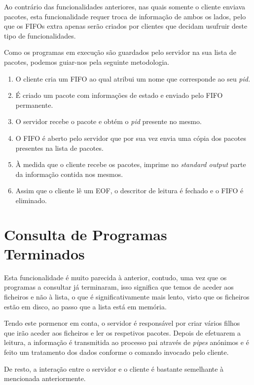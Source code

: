 \documentclass[12pt,a4paper]{report}
\begin{document}
        Ao contrário das funcionalidades anteriores, nas quais somente o cliente enviava pacotes, esta funcionalidade requer troca de informação de ambos os lados, pelo que os FIFOs extra apenas serão criados por clientes que decidam usufruir deste tipo de funcionalidades.

        Como os programas em execução são guardados pelo servidor na sua lista de pacotes, podemos guiar-nos pela seguinte metodologia.

        \begin{enumerate}
            \item O cliente cria um FIFO ao qual atribui um nome que corresponde ao seu \textit{pid.}
            \item É criado um pacote com informações de estado e enviado pelo FIFO permanente.
            \item O servidor recebe o pacote e obtém o \textit{pid} presente no mesmo.
            \item O FIFO é aberto pelo servidor que por sua vez envia uma cópia dos pacotes presentes na lista de pacotes.
            \item À medida que o cliente recebe os pacotes, imprime no \textit{standard output} parte da informação contida nos mesmos.
            \item Assim que o cliente lê um EOF, o descritor de leitura é fechado e o FIFO é eliminado.
        \end{enumerate}

    \section{Consulta de Programas Terminados}

        Esta funcionalidade é muito parecida à anterior, contudo, uma vez que os programas a consultar já terminaram, isso significa que temos de aceder aos ficheiros e não à lista, o que é significativamente mais lento, visto que os ficheiros estão em disco, ao passo que a lista está em memória.

        Tendo este pormenor em conta, o servidor é responsável por criar vários filhos que irão aceder aos ficheiros e ler os respetivos pacotes. Depois de efetuarem a leitura, a informação é transmitida ao processo pai através de \textit{pipes} anónimos e é feito um tratamento dos dados conforme o comando invocado pelo cliente.

        De resto, a interação entre o servidor e o cliente é bastante semelhante à mencionada anteriormente.
\end{document}
